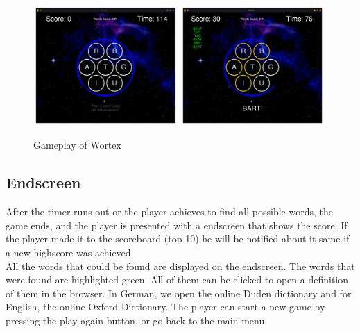 \documentclass{article}[12pt]
\begin{document}
       \begin{figure}[h!]
        \includegraphics[width=0.49\textwidth]{pictures/gameplay.png}
        \includegraphics[width=0.49\textwidth]{pictures/mid_game.png}
        \caption{Gameplay of Wortex}
    \end{figure}
    
    \newpage

    \subsection*{Endscreen}
    
    After the timer runs out or the player achieves to find all possible words,
    the game ends, and the player is presented with a endscreen that shows the
    score. If the player made it to the scoreboard (top 10) he will be notified about it same if a new highscore was achieved.\\ All the words that could be found are displayed on the endscreen. The words that were found are highlighted green. All of them can be clicked to open a definition of them in the browser. In German, we open the online Duden
    dictionary and for English, the online Oxford Dictionary. The player can
    start a new game by pressing the play again button, or go back to the
    main menu. 
\end{document}

